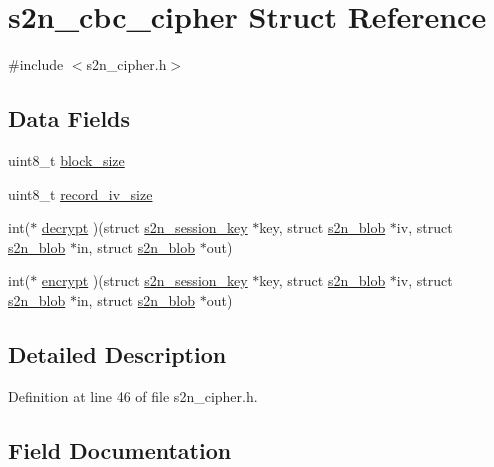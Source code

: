 \hypertarget{structs2n__cbc__cipher}{}\section{s2n\+\_\+cbc\+\_\+cipher Struct Reference}
\label{structs2n__cbc__cipher}


{\ttfamily \#include $<$s2n\+\_\+cipher.\+h$>$}

\subsection*{Data Fields}
\begin{DoxyCompactItemize}
\item 
uint8\+\_\+t \hyperlink{structs2n__cbc__cipher_a62e5f3609522c577e2c341f3cce95b5c}{block\+\_\+size}
\item 
uint8\+\_\+t \hyperlink{structs2n__cbc__cipher_af6c57bc6bf62e1b811c6771a76e38448}{record\+\_\+iv\+\_\+size}
\item 
int($\ast$ \hyperlink{structs2n__cbc__cipher_afd72553012c67d9a116f2ed5fa7bf00d}{decrypt} )(struct \hyperlink{structs2n__session__key}{s2n\+\_\+session\+\_\+key} $\ast$key, struct \hyperlink{structs2n__blob}{s2n\+\_\+blob} $\ast$iv, struct \hyperlink{structs2n__blob}{s2n\+\_\+blob} $\ast$in, struct \hyperlink{structs2n__blob}{s2n\+\_\+blob} $\ast$out)
\item 
int($\ast$ \hyperlink{structs2n__cbc__cipher_a6154026b061247eb62e699408ec22cab}{encrypt} )(struct \hyperlink{structs2n__session__key}{s2n\+\_\+session\+\_\+key} $\ast$key, struct \hyperlink{structs2n__blob}{s2n\+\_\+blob} $\ast$iv, struct \hyperlink{structs2n__blob}{s2n\+\_\+blob} $\ast$in, struct \hyperlink{structs2n__blob}{s2n\+\_\+blob} $\ast$out)
\end{DoxyCompactItemize}


\subsection{Detailed Description}


Definition at line 46 of file s2n\+\_\+cipher.\+h.



\subsection{Field Documentation}
